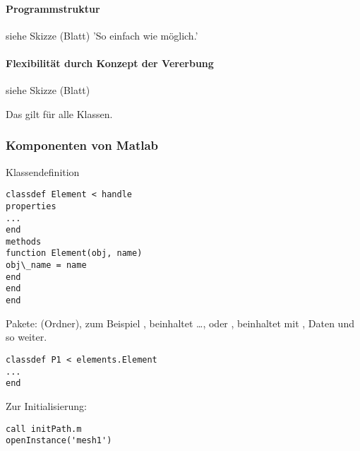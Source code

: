 \paragraph{Programmstruktur}
siehe Skizze (Blatt)
'So einfach wie möglich.'
\paragraph{Flexibilität durch Konzept der Vererbung}
siehe Skizze (Blatt)

Das gilt für alle Klassen.

\subsubsection{Komponenten von Matlab}
Klassendefinition
\begin{verbatim}
classdef Element < handle
properties
...
end 
methods
function Element(obj, name)
obj\_name = name
end
end 
end
\end{verbatim}

Pakete: (Ordner), zum Beispiel , beinhaltet  \dots, oder ,  beinhaltet  mit , Daten  und so weiter. 
\begin{verbatim}
classdef P1 < elements.Element
...
end
\end{verbatim}
Zur Initialisierung: 
\begin{verbatim}
call initPath.m
openInstance('mesh1')
\end{verbatim}
